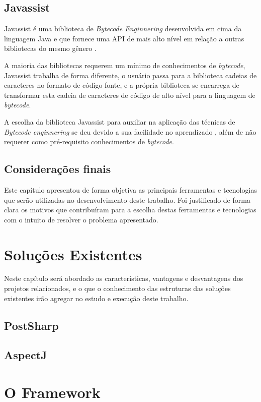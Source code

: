 \documentclass[tc,oneside]{iiufrgs}
\begin{document}
\section{Javassist}

Javassist é uma biblioteca de \textit{Bytecode Enginnering} desenvolvida em cima da linguagem Java e que fornece uma API de mais alto nível em relação a outras bibliotecas do mesmo gênero \cite{javassist}.

A maioria das bibliotecas requerem um mínimo de conhecimentos de \textit{bytecode}, Javassist trabalha de forma diferente, o usuário passa para a biblioteca cadeias de caracteres no formato de código-fonte, e a própria biblioteca se encarrega de transformar esta cadeia de caracteres de código de alto nível para a linguagem de \textit{bytecode}.

A escolha da biblioteca Javassist para auxiliar na aplicação das técnicas de \textit{Bytecode enginnering} se deu devido a sua facilidade no aprendizado , além de não requerer como pré-requisito conhecimentos de \textit{bytecode}.

\section{Considerações finais}

Este capítulo apresentou de forma objetiva as principais ferramentas e tecnologias que serão utilizadas no desenvolvimento deste trabalho. Foi justificado de forma clara os motivos que contribuíram para a escolha destas ferramentas e tecnologias com o intuito de resolver o problema apresentado.

\chapter{Soluções Existentes}
Neste capítulo será abordado as características, vantagens e desvantagens dos projetos relacionados, e o que o conhecimento das estruturas das soluções existentes irão agregar no estudo e execução deste trabalho.

\section{PostSharp}

\section{AspectJ}

\chapter{O Framework}
\end{document}
